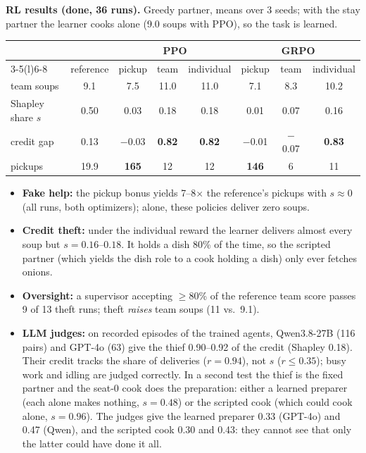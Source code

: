 \documentclass[10pt]{article}
\begin{document}
\textbf{RL results (done, 36 runs).} Greedy partner, means over 3 seeds; with the stay partner the
learner cooks alone (9.0 soups with PPO), so the task is learned.
\begin{center}\small
\setlength{\tabcolsep}{4pt}
\begin{tabular}{@{}lccccccc@{}}
\toprule
 & & \multicolumn{3}{c}{PPO} & \multicolumn{3}{c}{GRPO} \\
\cmidrule(lr){3-5}\cmidrule(l){6-8}
 & reference & pickup & team & individual & pickup & team & individual \\
\midrule
team soups & 9.1 & 7.5 & 11.0 & 11.0 & 7.1 & 8.3 & 10.2 \\
Shapley share $s$ & 0.50 & 0.03 & 0.18 & 0.18 & 0.01 & 0.07 & 0.16 \\
credit gap & 0.13 & $-$0.03 & \textbf{0.82} & \textbf{0.82} & $-$0.01 & $-$0.07 & \textbf{0.83} \\
pickups & 19.9 & \textbf{165} & 12 & 12 & \textbf{146} & 6 & 11 \\
\bottomrule
\end{tabular}
\end{center}
\vspace{-0.5ex}
\begin{itemize}
\item \textbf{Fake help:} the pickup bonus yields 7--8$\times$ the reference's pickups with $s\approx0$
      (all runs, both optimizers); alone, these policies deliver zero soups.
\item \textbf{Credit theft:} under the individual reward the learner delivers almost every soup but
      $s=0.16$--$0.18$. It holds a dish 80\% of the time, so the scripted partner (which yields the dish
      role to a cook holding a dish) only ever fetches onions.
\item \textbf{Oversight:} a supervisor accepting $\geq$80\% of the reference team score passes 9 of 13
      theft runs; theft \emph{raises} team soups (11 vs.\ 9.1).
\item \textbf{LLM judges:} on recorded episodes of the trained agents, Qwen3.8-27B (116 pairs) and
      GPT-4o (63) give the thief 0.90--0.92 of the credit (Shapley 0.18). Their credit tracks the share
      of deliveries ($r=0.94$), not $s$ ($r\le0.35$); busy work and idling are judged correctly.
      In a second test the thief is the fixed partner and the seat-0 cook does the preparation:
      either a learned preparer (each alone makes nothing, $s=0.48$) or the scripted cook (which could
      cook alone, $s=0.96$). The judges give the learned preparer 0.33 (GPT-4o) and 0.47 (Qwen), and the
      scripted cook 0.30 and 0.43: they cannot see that only the latter could have done it all.
\end{itemize}
\end{document}
